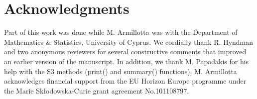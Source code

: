 \section{Acknowledgments}
Part of this work was done while M. Armillotta was with the Department of Mathematics \& Statistics, University of Cyprus.
We cordially thank R. Hyndman and two anonymous reviewers for several constructive comments that improved an earlier version 
of the manuscript. In addition, we thank M. Papadakis for his help with the S3 methods (print() and summary() functions).
M. Armillotta acknowledges financial support from the EU Horizon Europe programme under the Marie Skłodowska-Curie grant agreement No.101108797.




\address{Mirko Armillotta\\
	Vrije Universiteit Amsterdam\\
	Department of Econometrics and Data Science\\
	Netherlands\\
	Tinbergen Institute\\
	Netherlands\\
	ORCiD: \href{https://orcid.org/0000-0002-0548-6957}{0000-0002-0548-6957}\\
	}

\address{Michail Tsagris\\
	University of Crete\\
	Department of Economics\\
	Greece\\
	ORCiD: \href{https://orcid.org/0000-0002-2049-3063}{0000-0002-2049-3063}\\
	}

\address{Konstantinos Fokianos\\
	University of Cyprus\\
	Department of Mathematics and Statistics\\
	Cyprus\\
	ORCiD: \href{https://orcid.org/0000-0002-0051-711X}{0000-0002-0051-711X}\\
	}
